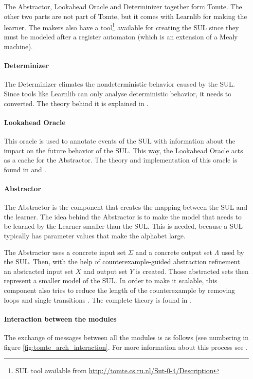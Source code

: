 \documentclass[multi,crop=false,class=article]{standalone}
\begin{document}
The Abstractor, Lookahead Oracle and Determinizer together form Tomte. The
other two parts are not part of Tomte, but it comes with Learnlib for making
the learner. The makers also have a tool\footnote{SUL tool available from
\url{http://tomte.cs.ru.nl/Sut-0-4/Description}} available for creating the SUL
since they must be modeled after a register automaton\cite{Aarts2015}
(which is an extension of a Mealy machine).

\paragraph{Determinizer} The Determinizer elimates the nondeterministic
behavior caused by the SUL. Since tools like Learnlib can only analyse
deterministic behavior, it needs to converted. The theory behind it is
explained in \cite[p. 172]{Aarts2015}.

\paragraph{Lookahead Oracle} This oracle is used to annotate events of the SUL
with information about the impact on the future behavior of the SUL. This way,
the Lookahead Oracle acts as a cache for the Abstractor. The theory and
implementation of this oracle is found in \cite[p. 170]{Aarts2014} and
\cite[p. 105]{Tomte2014}.

\paragraph{Abstractor} The Abstractor is the component that creates the mapping
between the SUL and the learner. The idea behind the Abstractor is to make the
model that needs to be learned by the Learner smaller than the SUL. This is
needed, because a SUL typically has parameter values that make the alphabet
large.

The Abstractor uses a concrete input set $\Sigma$ and a concrete
output set $\Lambda$ used by the SUL. Then, with the help of
counterexample-guided abstraction refinement\cite[p. 104]{Tomte2014} an
abstracted input set $X$ and output set $Y$ is created. Those abstracted sets
then represent a smaller model of the SUL. In order to make it scalable, this
component also tries to reduce the length of the counterexample by removing
loops and single transitions \cite{Koopman2014}. The complete theory is found
in \cite{Tomte2014}.

\paragraph{Interaction between the modules} The exchange of messages between
all the modules is as follows (see numbering in figure
\ref{fig:tomte_arch_interaction}. For more information about this process see
\cite{Aarts2015,Tomte2014}.
\end{document}
